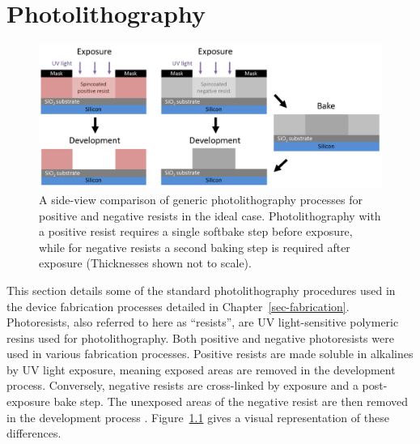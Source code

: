 \documentclass[
  a4paper,
]{scrbook}
\begin{document}
\hypertarget{sec-photolithography}{%
\chapter{Photolithography}\label{sec-photolithography}}

\begin{figure}

{\centering \includegraphics{./figures/app1/positive-negative-photolithography.png}

}

\caption{\label{fig-photolithography-types}A side-view comparison of
generic photolithography processes for positive and negative resists in
the ideal case. Photolithography with a positive resist requires a
single softbake step before exposure, while for negative resists a
second baking step is required after exposure (Thicknesses shown not to
scale).}

\end{figure}

This section details some of the standard photolithography procedures
used in the device fabrication processes detailed in
Chapter~\ref{sec-fabrication}. Photoresists, also referred to here as
``resists'', are UV light-sensitive polymeric resins used for
photolithography. Both positive and negative photoresists were used in
various fabrication processes. Positive resists are made soluble in
alkalines by UV light exposure, meaning exposed areas are removed in the
development process. Conversely, negative resists are cross-linked by
exposure and a post-exposure bake step. The unexposed areas of the
negative resist are then removed in the development process
\autocite{Microchemicals}. Figure~\ref{fig-photolithography-types} gives
a visual representation of these differences.
\end{document}
